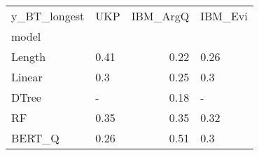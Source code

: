 \begin{tabular}{llrl}
\toprule
y\_BT\_longest &   UKP &  IBM\_ArgQ & IBM\_Evi \\
model  &       &           &         \\
\midrule
Length &  0.41 &      0.22 &    0.26 \\
Linear &   0.3 &      0.25 &     0.3 \\
DTree  &     - &      0.18 &       - \\
RF     &  0.35 &      0.35 &    0.32 \\
BERT\_Q &  0.26 &      0.51 &     0.3 \\
\bottomrule
\end{tabular}

